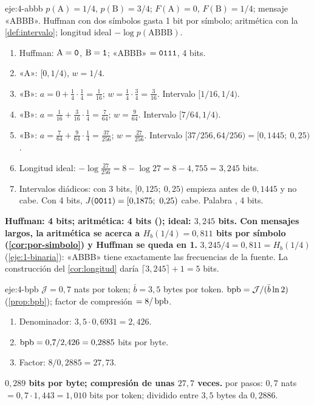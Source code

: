 \begin{solucion}{eje:4-abbb}
\datos $p(\mathrm{A})=1/4$, $p(\mathrm{B})=3/4$; $F(\mathrm{A})=0$, $F(\mathrm{B})=1/4$; mensaje «ABBB».
\planteamiento Huffman con dos símbolos gasta 1 bit por símbolo; aritmética con la \cref{def:intervalo}; longitud ideal $-\log p(\text{ABBB})$.
\pasos
\begin{enumerate}[label=\arabic*.]
  \item Huffman: $\mathrm{A}=\textnormal{\texttt{0}}$, $\mathrm{B}=\textnormal{\texttt{1}}$; «ABBB» $=\textnormal{\texttt{0111}}$, 4 bits.
  \item «A»: $[0,1/4)$, $w=1/4$.
  \item «B»: $a=0+\tfrac14\cdot\tfrac14=\tfrac1{16}$; $w=\tfrac14\cdot\tfrac34=\tfrac3{16}$. Intervalo $[1/16,1/4)$.
  \item «B»: $a=\tfrac1{16}+\tfrac3{16}\cdot\tfrac14=\tfrac{7}{64}$; $w=\tfrac{9}{64}$. Intervalo $[7/64,1/4)$.
  \item «B»: $a=\tfrac7{64}+\tfrac9{64}\cdot\tfrac14=\tfrac{37}{256}$; $w=\tfrac{27}{256}$. Intervalo $[37/256,64/256)=[0{,}1445;\ 0{,}25)$.
  \item Longitud ideal: $-\log\tfrac{27}{256}=8-\log 27=8-4{,}755=3{,}245$ bits.
  \item Intervalos diádicos: con 3 bits, $[0{,}125;\ 0{,}25)$ empieza antes de $0{,}1445$ y no cabe. Con 4 bits, $J(\textnormal{\texttt{0011}})=[0{,}1875;\ 0{,}25)$ cabe. Palabra , 4 bits.
\end{enumerate}
\resultado \textbf{Huffman: 4 bits; aritmética: 4 bits (); ideal: $3{,}245$ bits. Con mensajes largos, la aritmética se acerca a $H_b(1/4)=0{,}811$ bits por símbolo (\cref{cor:por-simbolo}) y Huffman se queda en 1.}
\comprobacion $3{,}245/4=0{,}811=H_b(1/4)$ (\cref{eje:1-binaria}): «ABBB» tiene exactamente las frecuencias de la fuente. La construcción del \cref{cor:longitud} daría $\lceil 3{,}245\rceil+1=5$ bits.
\end{solucion}

\begin{solucion}{eje:4-bpb}
\datos $\mathcal{J}=0{,}7$ nats por token; $\bar b=3{,}5$ bytes por token.
\planteamiento $\operatorname{bpb}=\mathcal{J}/(\bar b\ln 2)$ (\cref{prop:bpb}); factor de compresión $=8/\operatorname{bpb}$.
\pasos
\begin{enumerate}[label=\arabic*.]
  \item Denominador: $3{,}5\cdot 0{,}6931=2{,}426$.
  \item $\operatorname{bpb}=0{,}7/2{,}426=0{,}2885$ bits por byte.
  \item Factor: $8/0{,}2885=27{,}73$.
\end{enumerate}
\resultado \textbf{$0{,}289$ bits por byte; compresión de unas $27{,}7$ veces.}
\comprobacion por pasos: $0{,}7$ nats $=0{,}7\cdot 1{,}443=1{,}010$ bits por token; dividido entre $3{,}5$ bytes da $0{,}2886$.
\end{solucion}

